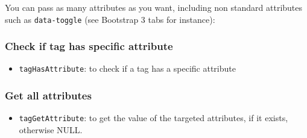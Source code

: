 \documentclass[]{book}
\newenvironment{Shaded}{\begin{snugshade}}{\end{snugshade}}
\newcommand{\CommentTok}[1]{\textcolor[rgb]{0.56,0.35,0.01}{\textit{#1}}}
\newcommand{\DataTypeTok}[1]{\textcolor[rgb]{0.13,0.29,0.53}{#1}}
\newcommand{\KeywordTok}[1]{\textcolor[rgb]{0.13,0.29,0.53}{\textbf{#1}}}
\newcommand{\NormalTok}[1]{#1}
\newcommand{\OperatorTok}[1]{\textcolor[rgb]{0.81,0.36,0.00}{\textbf{#1}}}
\newcommand{\StringTok}[1]{\textcolor[rgb]{0.31,0.60,0.02}{#1}}
\providecommand{\tightlist}{%
  \setlength{\itemsep}{0pt}\setlength{\parskip}{0pt}}
\begin{document}
You can pass as many attributes as you want, including non standard attributes such as \texttt{data-toggle} (see Bootstrap 3 tabs for instance):

\begin{Shaded}
\end{Shaded}

\hypertarget{check-if-tag-has-specific-attribute}{%
\subsubsection{Check if tag has specific attribute}\label{check-if-tag-has-specific-attribute}}

\begin{itemize}
\tightlist
\item
  \texttt{tagHasAttribute}: to check if a tag has a specific attribute
\end{itemize}

\begin{Shaded}
\end{Shaded}

\hypertarget{get-all-attributes}{%
\subsubsection{Get all attributes}\label{get-all-attributes}}

\begin{itemize}
\tightlist
\item
  \texttt{tagGetAttribute}: to get the value of the targeted attributes, if it exists, otherwise NULL.
\end{itemize}
\end{document}
